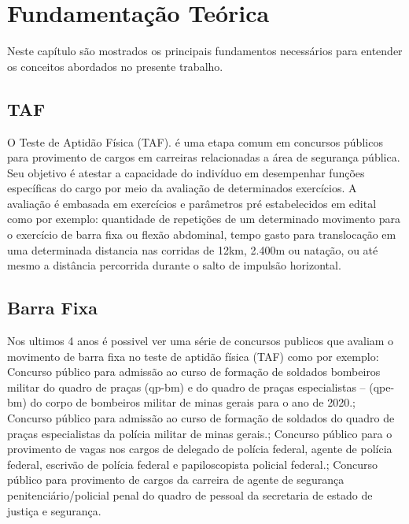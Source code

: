 \chapter{Fundamentação Teórica}

Neste capítulo são mostrados os principais fundamentos necessários para entender os
conceitos abordados no presente trabalho.

\section[TAF]{TAF}


O Teste de Aptidão Física (TAF). é uma etapa comum em concursos públicos para provimento de cargos em carreiras relacionadas a área de segurança pública. Seu objetivo é atestar a capacidade do indivíduo em desempenhar funções específicas do cargo por meio da avaliação de determinados exercícios. A avaliação é embasada em exercícios e parâmetros pré estabelecidos em edital como por exemplo: quantidade de repetições de um determinado movimento para o exercício de barra fixa ou flexão abdominal, tempo gasto para translocação em uma determinada distancia nas corridas de 12km, 2.400m ou natação, ou até mesmo a distância percorrida durante o salto de impulsão horizontal.


\section[Barra Fixa]{Barra Fixa}

Nos ultimos 4 anos é possivel ver uma série de concursos publicos que avaliam o movimento de barra fixa no teste de aptidão física (TAF) como por exemplo:
Concurso público para admissão ao curso de formação de soldados bombeiros militar do quadro de praças (qp-bm) e do quadro de praças especialistas – (qpe-bm) do corpo de bombeiros militar de minas gerais para o ano de 2020.\cite{eCBMG2018};
Concurso público para admissão ao curso de formação de soldados do quadro de praças especialistas da polícia militar de minas gerais.\cite{ePMMG2021};
Concurso público para o provimento de vagas nos cargos de delegado de polícia federal, agente de polícia federal, escrivão de polícia federal e papiloscopista policial federal.\cite{ePF2021};
Concurso público para provimento de cargos da carreira de agente de segurança penitenciário/policial penal do quadro de pessoal da secretaria de estado de justiça e segurança\cite{ePP2021}.

